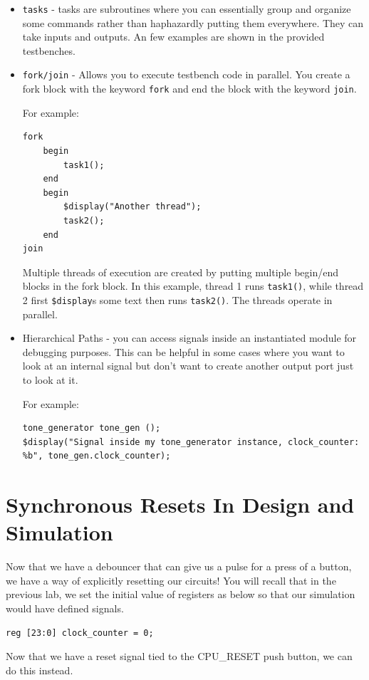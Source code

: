 \documentclass[11pt]{article}
\begin{document}
\begin{itemize}
\item \verb|tasks| - tasks are subroutines where you can essentially group and organize some commands rather than haphazardly putting them everywhere. They can take inputs and outputs. An few examples are shown in the provided testbenches.

\item \verb|fork/join| - Allows you to execute testbench code in parallel. You create a fork block with the keyword \verb|fork| and end the block with the keyword \verb|join|.

For example:
\begin{verbatim}
fork
	begin
		task1();
	end
	begin
		$display("Another thread");
		task2();
	end
join
\end{verbatim}

Multiple threads of execution are created by putting multiple begin/end blocks in the fork block. In this example, thread 1 runs \verb|task1()|, while thread 2 first \verb|$display|s some text then runs \verb|task2()|. The threads operate in parallel.

\item Hierarchical Paths - you can access signals inside an instantiated module for debugging purposes. This can be helpful in some cases where you want to look at an internal signal but don't want to create another output port just to look at it.

For example:
\begin{verbatim}
tone_generator tone_gen ();
$display("Signal inside my tone_generator instance, clock_counter: %b", tone_gen.clock_counter);
\end{verbatim} 
\end{itemize}

\section{Synchronous Resets In Design and Simulation}
Now that we have a debouncer that can give us a pulse for a press of a button, we have a way of explicitly resetting our circuits! You will recall that in the previous lab, we set the initial value of registers as below so that our simulation would have defined signals.

\begin{verbatim}
reg [23:0] clock_counter = 0;
\end{verbatim}

Now that we have a reset signal tied to the CPU\_RESET push button, we can do this instead.
\end{document}
